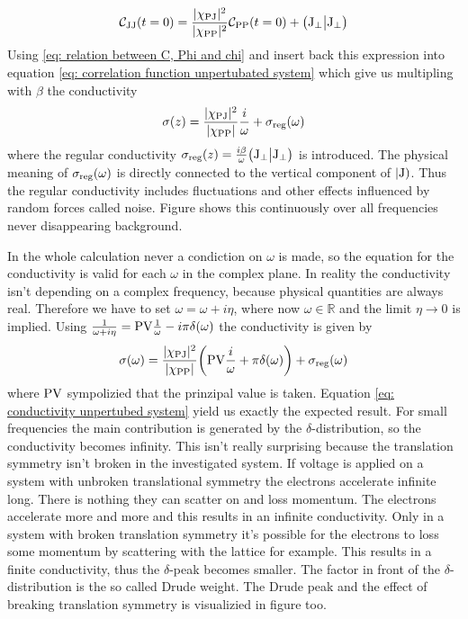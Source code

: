 %
\begin{align}
	\mathcal{C}_{\mathrm{JJ}}(t=0) = \frac{\vert\chi_{\mathrm{PJ}}\vert^{2}}{\vert\chi_{\mathrm{PP}}\vert^{2}} \mathcal{C}_{\mathrm{PP}}(t=0) + \big({\mathrm{J}_{\bot}}\big|{\mathrm{J}_{\bot}}\big)
\end{align}
%
Using \eqref{eq: relation between C, Phi and chi} and insert back this expression into equation \eqref{eq: correlation function unpertubated system} which give us multipling with $\beta$ the conductivity
%
\begin{align}
	\sigma (z) = \frac{\vert\chi_{\mathrm{PJ}}\vert^{2}}{\vert\chi_{\mathrm{PP}}\vert} \frac{i}{\omega}  + \sigma_{\mathrm{reg}}(\omega)
\end{align}
%
where the regular conductivity $\sigma_{\mathrm{reg}}(z) = \frac{i \beta}{\omega} \big({\mathrm{J}_{\bot}}\big|{\mathrm{J}_{\bot}}\big)$ is introduced.
The physical meaning of $\sigma_{\mathrm{reg}}(\omega)$ is directly connected to the vertical component of $|\mathrm{\mathrm{J}})$.
Thus the regular conductivity includes fluctuations and other effects influenced by random forces called noise.
Figure  shows this continuously over all frequencies never disappearing background.

In the whole calculation never a condiction on $\omega$ is made, so the equation for the conductivity is valid for each $\omega$ in the complex plane.
In reality the conductivity isn't depending on a complex frequency, because physical quantities are always real.
Therefore we have to set $\omega = \omega + i \eta$, where now $\omega \in \mathbb{R}$ and the limit $\eta \to 0$ is implied.
Using $\frac{1}{\omega + i\eta} = \mathrm{PV}\frac{1}{\omega} - i\pi\delta(\omega)$ the conductivity is given by
%
\begin{align}
	\sigma(\omega) = \frac{\vert\chi_{\mathrm{PJ}}\vert^{2}}{\vert\chi_{\mathrm{PP}}\vert} \bigg(\mathrm{PV} \frac{i}{\omega} + \pi \delta(\omega) \bigg) + \sigma_{\mathrm{reg}}(\omega)
	\label{eq: conductivity unpertubed system}
\end{align}
%
where $\mathrm{PV}$ sympolizied that the prinzipal value is taken.
Equation \eqref{eq: conductivity unpertubed system} yield us exactly the expected result.
For small frequencies the main contribution is generated by the $\delta$-distribution, so the conductivity becomes infinity.
This isn't really surprising because the translation symmetry isn't broken in the investigated system.
If voltage is applied on a system with unbroken translational symmetry the electrons accelerate infinite long.
There is nothing they can scatter on and loss momentum.
The electrons accelerate more and more and this results in an infinite conductivity.
Only in a system with broken translation symmetry it's possible for the electrons to loss some momentum by scattering with the lattice for example.
This results in a finite conductivity, thus the $\delta$-peak becomes smaller.
The factor in front of the $\delta$-distribution is the so called Drude weight.
The Drude peak and the effect of breaking translation symmetry is visualizied in figure  too.
%
%
